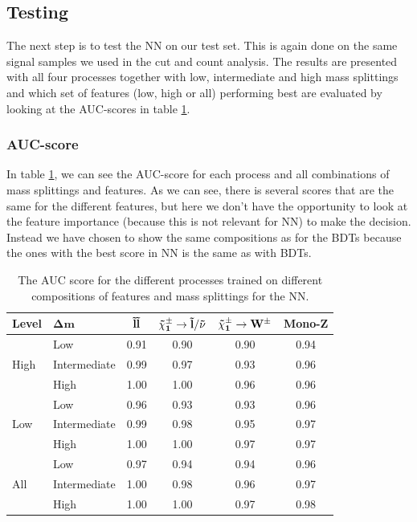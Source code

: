 \subsection{Testing}
The next step is to test the NN on our test set. This is again done on the same signal samples we used in the cut and count analysis. The results are presented with all four processes together with low, intermediate and high mass splittings and which set of features (low, high or all) performing best are evaluated by looking at the AUC-scores in table \ref{tab:AUCNN}.


\subsubsection{AUC-score}
In table \ref{tab:AUCNN}, we can see the AUC-score for each process and all combinations of mass splittings and features. As we can see, there is several scores that are the same for the different features, but here we don't have the opportunity to look at the feature importance (because this is not relevant for NN) to make the decision. Instead we have chosen to show the same compositions as for the BDTs because the ones with the best score in NN is the same as with BDTs. 

\begin{table}[H]
    \centering
    \renewcommand{\arraystretch}{1.}
    \begin{tabular}{l l c c c c }
    \toprule
    \textbf{Level} & $\mathbf{\Delta m}$ & $\mathbf{\Tilde{l} \Tilde{l}}$ & $\mathbf{\Tilde{\chi}_1^\pm \rightarrow \Tilde{l}/\Tilde{\nu}}$ & $\mathbf{\Tilde{\chi}_1^\pm \rightarrow W^\pm}$ & \textbf{Mono-Z}  \\
    \midrule
    \midrule
    \multirow{3}{*}{High} &  Low   & 0.91 & 0.90 & 0.90 & 0.94 \\
     & Intermediate & 0.99 & 0.97 & 0.93 & 0.96 \\
     & High & 1.00 & 1.00 & 0.96 & 0.96 \\
     \midrule
    \multirow{3}{*}{Low} & Low & 0.96 & 0.93 & 0.93 & 0.96 \\
     & Intermediate & 0.99 & 0.98 & 0.95 & 0.97 \\
     & High & 1.00 & 1.00 & 0.97 & 0.97 \\
     \midrule
    \multirow{3}{*}{All} & Low & 0.97 & 0.94 & 0.94 & 0.96 \\
     & Intermediate & 1.00 & 0.98 & 0.96 & 0.97 \\
     & High & 1.00 & 1.00 & 0.97 & 0.98 \\
     \bottomrule
    \end{tabular}
    \caption{The AUC score for the different processes trained on different compositions of features and mass splittings for the NN.}
    \label{tab:AUCNN}
\end{table}







